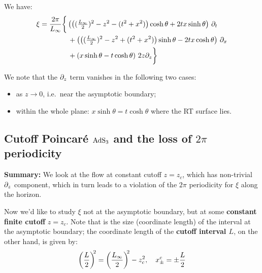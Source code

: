 \documentclass[11pt,a4paper,utf8]{article}
\begin{document}
	We have:
	\begin{gather}
	\begin{aligned}
		\xi &= \frac{2\pi}{L_\infty} \bigg\{
			\left(
				\left(
					(\tfrac{L_\infty}{2})^2 - z^2
					- (t^2 + x^2)
				\right) \cosh\theta
				+ 2tx \sinh\theta
			\right) \,\partial_{t}
		\\ &\qquad\qquad 
			+ \left(
				\left(
					(\tfrac{L_\infty}{2})^2 - z^2
					+ (t^2 + x^2)
				\right) \sinh\theta
				- 2tx \cosh\theta
			\right) \,\partial_{x}
		\\ &\qquad\qquad 
			+ \left(
				x\sinh\theta
				- t\cosh\theta
			\right) \,2z\partial_{z}
		\bigg\}
	\end{aligned}
	\end{gather}


	
	We note that the $\partial_{z}$ term vanishes in the following two cases:
	\begin{itemize}[noitemsep,topsep=0pt]
	\item as $z\to 0$, i.e.~near the asymptotic boundary;
	\item within the whole plane: $
			x\sinh\theta
			= t\cosh\theta
		$ where the RT surface lies. 
	\end{itemize}
	
\subsection{Cutoff Poincar\'e $\mathrm{AdS}_3$ and the loss of $2\pi$ periodicity}

\textbf{Summary:} We look at the flow at constant cutoff $z = z_c$, which has non-trivial $\partial_{z}$ component, which in turn leads to a violation of the $2\pi$ periodicity for $\xi$ along the horizon.
	
	Now we'd like to study $\xi$ not at the asymptotic boundary, but at some \textbf{constant finite cutoff} $z = z_c$. 
	Note that is the size (coordinate length) of the interval at the {asymptotic boundary}; the coordinate length of the \textbf{cutoff interval $L$}, on the other hand, is given by:
	\begin{equation}
		\left(\frac{L}{2}\right)^{\!\!2}
		= \left(\frac{L_\infty}{2}\right)^{\!\!2} - z_c^2,
	\quad
		x_\pm^c
		= \pm \frac{L}{2}
	\label{eq:length_relations}
	\end{equation}
	
\end{document}
